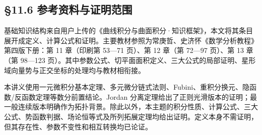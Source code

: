 \documentclass[11pt,a4paper]{article}
\begin{document}
\subsection{§11.6
参考资料与证明范围}\label{ux53c2ux8003ux8d44ux6599ux4e0eux8bc1ux660eux8303ux56f4}

基础知识结构来自用户上传的《曲线积分与曲面积分·知识框架》，本文将其条目展开成定义、计算公式和证明。主要教材参照为常庚哲、史济怀《数学分析教程》第四版下册：第
11 章（印刷第 53---71 页）、第 12 章（第 72---97 页）、第 13 章（第
98---123
页）。其中参数公式、切平面面积定义、三大公式的局部证明、星形域向量势与正交坐标的处理均与教材相衔接。

本讲义使用一元微积分基本定理、多元微分链式法则、Fubini、重积分换元、隐函数/反函数定理等数分前置结论。Jordan
分离定理给出了正则光滑版本的证明；最一般连续版本明确作为拓扑背景。除此以外，本主题的积分性质、计算公式、三大公式、势函数判据、场论恒等式及所列拓展定理均给出证明。定义本身不需证明，但其存在性、参数不变性和相互转换均已论证。
\end{document}
